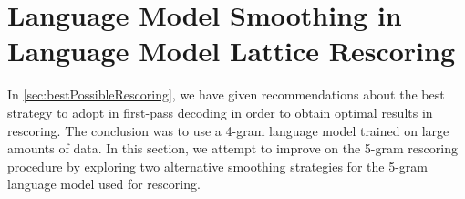 
\section{Language Model Smoothing in Language Model Lattice Rescoring}
\label{sec:sbVSkn}


In \autoref{sec:bestPossibleRescoring}, we have given recommendations
about the best strategy to adopt in first-pass decoding in order
to obtain optimal results in rescoring. The conclusion was to use
a 4-gram language model trained on large amounts of data.
In this section, we attempt to improve on the 5-gram rescoring
procedure by exploring two alternative smoothing strategies for the
5-gram language model used for rescoring.

